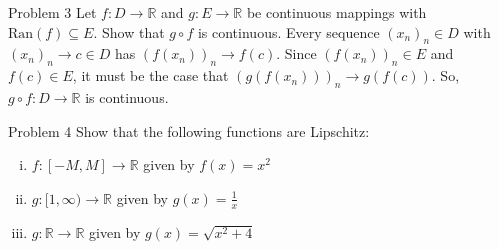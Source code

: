 \documentclass[10pt]{extarticle}
\newcommand{\ran}{\text{Ran}}
\newcommand{\R}{\mathbb{R}}
\begin{document}
  \begin{problem}{Problem 3}
    Let $f: D\rightarrow \R$ and $g: E\rightarrow \R$ be continuous mappings with $\ran(f)\subseteq E$. Show that $g\circ f$ is continuous.
    \tcblower
    Every sequence $(x_n)_n\in D$ with $(x_n)_n \rightarrow c\in D$ has $(f(x_n))_n \rightarrow f(c)$. Since $(f(x_n))_n \in E$ and $f(c)\in E$, it must be the case that $(g(f(x_n)))_n \rightarrow g(f(c))$. So, $g\circ f: D\rightarrow \R$ is continuous.
  \end{problem}
  \begin{problem}{Problem 4}
    Show that the following functions are Lipschitz:
    \begin{enumerate}[(i)]
      \item $f: [-M,M] \rightarrow \R$ given by $f(x) = x^2$
      \item $g: [1,\infty)\rightarrow \R$ given by $g(x) = \frac{1}{x}$
      \item $g: \R \rightarrow \R$ given by $g(x) = \sqrt{x^2 + 4}$
    \end{enumerate}
  \end{problem}
\end{document}
